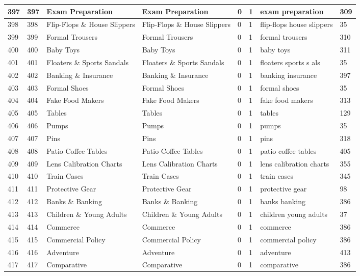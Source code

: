 \begin{longtable}{|l|l|l|l|l|l|l|l|}
397 & 397 & Exam Preparation & Exam Preparation & 0 & 1 & exam preparation & 309 \\ \hline 
398 & 398 & Flip-Flops \& House Slippers & Flip-Flops \& House Slippers & 0 & 1 & flip-flops house slippers & 35 \\ \hline 
399 & 399 & Formal Trousers & Formal Trousers & 0 & 1 & formal trousers & 310 \\ \hline 
400 & 400 & Baby Toys & Baby Toys & 0 & 1 & baby toys & 311 \\ \hline 
401 & 401 & Floaters \& Sports Sandals & Floaters \& Sports Sandals & 0 & 1 & floaters sports s als & 35 \\ \hline 
402 & 402 & Banking \& Insurance & Banking \& Insurance & 0 & 1 & banking insurance & 397 \\ \hline 
403 & 403 & Formal Shoes & Formal Shoes & 0 & 1 & formal shoes & 35 \\ \hline 
404 & 404 & Fake Food Makers & Fake Food Makers & 0 & 1 & fake food makers & 313 \\ \hline 
405 & 405 & Tables & Tables & 0 & 1 & tables & 129 \\ \hline 
406 & 406 & Pumps & Pumps & 0 & 1 & pumps & 35 \\ \hline 
407 & 407 & Pins & Pins & 0 & 1 & pins & 318 \\ \hline 
408 & 408 & Patio Coffee Tables & Patio Coffee Tables & 0 & 1 & patio coffee tables & 405 \\ \hline 
409 & 409 & Lens Calibration Charts & Lens Calibration Charts & 0 & 1 & lens calibration charts & 355 \\ \hline 
410 & 410 & Train Cases & Train Cases & 0 & 1 & train cases & 345 \\ \hline 
411 & 411 & Protective Gear & Protective Gear & 0 & 1 & protective gear & 98 \\ \hline 
412 & 412 & Banks \& Banking & Banks \& Banking & 0 & 1 & banks banking & 386 \\ \hline 
413 & 413 & Children \& Young Adults & Children \& Young Adults & 0 & 1 & children young adults & 37 \\ \hline 
414 & 414 & Commerce & Commerce & 0 & 1 & commerce & 386 \\ \hline 
415 & 415 & Commercial Policy & Commercial Policy & 0 & 1 & commercial policy & 386 \\ \hline 
416 & 416 & Adventure & Adventure & 0 & 1 & adventure & 413 \\ \hline 
417 & 417 & Comparative & Comparative & 0 & 1 & comparative & 386 \\ \hline 

\end{longtable}
